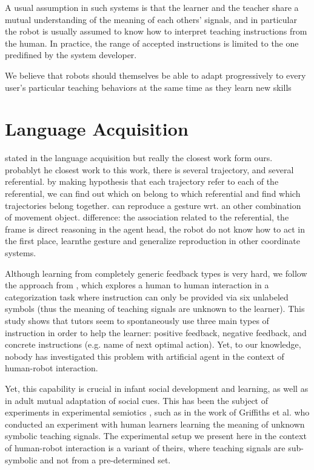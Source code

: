 A usual assumption in such systems is that the learner and the teacher share a mutual understanding of the meaning of each others' signals, and in particular the robot is usually assumed to know how to interpret teaching instructions from the human. In practice, the range of accepted instructions is limited to the one  predifined by the system developer.

 We believe that robots should themselves be able to adapt progressively to every user's particular teaching behaviors at the same time as they learn new skills

\section{Language Acquisition}
\label{chapter:related:language}

stated in the language acquisition but really the closest work form ours. \cite{cederborg2011imitating} probablyt he closest work to this work, there is several trajectory, and several referential. by making hypothesis that each trajectory refer to each of the referential, we can find out which on belong to which referential and find which trajectories belong together. can reproduce a gesture wrt. an other combination of movement object. 
difference: the association related to the referential, the frame is direct reasoning in the agent head, the robot do not know how to act in the first place, learnthe gesture and generalize reproduction in other coordinate systems.

Although learning from completely generic feedback types is very hard, we follow the approach from \cite{griffiths2012bottom}, which explores a human to human interaction in a categorization task where instruction can only be provided via six unlabeled symbols (thus the meaning of teaching signals are unknown to the learner). This study shows that tutors seem to spontaneously use three main types of instruction in order to help the learner: positive feedback, negative feedback, and concrete instructions (e.g. name of next optimal action). Yet, to our knowledge, nobody has investigated this problem with artificial agent in the context of human-robot interaction.

Yet, this capability is crucial in infant social development and learning, as well as in adult mutual adaptation of social cues. This has been the subject of experiments in experimental semiotics \cite{galantucci2009experimental}, such as in the work of Griffiths et al. \cite{griffiths2012bottom} who conducted an experiment with human learners learning the meaning of unknown symbolic teaching signals. The experimental setup we present here in the context of human-robot interaction is a variant of theirs, where teaching signals are sub-symbolic and not from a pre-determined set.

